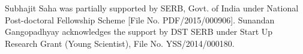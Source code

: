 \documentclass[two-column, nofootinbib]{revtex4-1}
\begin{document}

\begin{acknowledgments}
Subhajit Saha was partially supported by SERB, Govt. of India under National Post-doctoral Fellowship Scheme [File No. PDF/2015/000906]. Sunandan Gangopadhyay acknowledges the support by DST SERB under Start Up Research Grant (Young Scientist), File No. YSS/2014/000180.
\end{acknowledgments}


\frenchspacing
\begin{thebibliography}{150}


\end{thebibliography}
\end{document}
